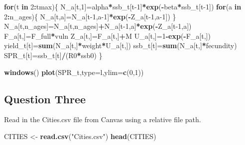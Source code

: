 \documentclass[
  12pt,
]{article}
\newenvironment{Shaded}{\begin{snugshade}}{\end{snugshade}}
\newcommand{\AttributeTok}[1]{\textcolor[rgb]{0.13,0.29,0.53}{#1}}
\newcommand{\ControlFlowTok}[1]{\textcolor[rgb]{0.13,0.29,0.53}{\textbf{#1}}}
\newcommand{\DecValTok}[1]{\textcolor[rgb]{0.00,0.00,0.81}{#1}}
\newcommand{\FunctionTok}[1]{\textcolor[rgb]{0.13,0.29,0.53}{\textbf{#1}}}
\newcommand{\NormalTok}[1]{#1}
\newcommand{\OtherTok}[1]{\textcolor[rgb]{0.56,0.35,0.01}{#1}}
\newcommand{\SpecialCharTok}[1]{\textcolor[rgb]{0.81,0.36,0.00}{\textbf{#1}}}
\newcommand{\StringTok}[1]{\textcolor[rgb]{0.31,0.60,0.02}{#1}}
\begin{document}
\begin{Shaded}
\begin{Highlighting}[]
\ControlFlowTok{for}\NormalTok{(t }\ControlFlowTok{in} \DecValTok{2}\SpecialCharTok{:}\NormalTok{tmax)\{}
\NormalTok{  N\_a[t,}\DecValTok{1}\NormalTok{]}\OtherTok{=}\NormalTok{alpha}\SpecialCharTok{*}\NormalTok{ssb\_t[t}\DecValTok{{-}1}\NormalTok{]}\SpecialCharTok{*}\FunctionTok{exp}\NormalTok{(}\SpecialCharTok{{-}}\NormalTok{beta}\SpecialCharTok{*}\NormalTok{ssb\_t[t}\DecValTok{{-}1}\NormalTok{])}
  \ControlFlowTok{for}\NormalTok{(a }\ControlFlowTok{in} \DecValTok{2}\SpecialCharTok{:}\NormalTok{n\_ages)\{}
\NormalTok{    N\_a[t,a]}\OtherTok{=}\NormalTok{N\_a[t}\DecValTok{{-}1}\NormalTok{,a}\DecValTok{{-}1}\NormalTok{]}\SpecialCharTok{*}\FunctionTok{exp}\NormalTok{(}\SpecialCharTok{{-}}\NormalTok{Z\_a[t}\DecValTok{{-}1}\NormalTok{,a}\DecValTok{{-}1}\NormalTok{])}
\NormalTok{  \}}
\NormalTok{  N\_a[t,n\_ages]}\OtherTok{=}\NormalTok{N\_a[t,n\_ages]}\SpecialCharTok{+}\NormalTok{N\_a[t}\DecValTok{{-}1}\NormalTok{,a]}\SpecialCharTok{*}\FunctionTok{exp}\NormalTok{(}\SpecialCharTok{{-}}\NormalTok{Z\_a[t}\DecValTok{{-}1}\NormalTok{,a])  }
\NormalTok{  F\_a[t,]}\OtherTok{=}\NormalTok{F\_full}\SpecialCharTok{*}\NormalTok{vuln}
\NormalTok{  Z\_a[t,]}\OtherTok{=}\NormalTok{F\_a[t,]}\SpecialCharTok{+}\NormalTok{M}
\NormalTok{  U\_a[t,]}\OtherTok{=}\DecValTok{1}\SpecialCharTok{{-}}\FunctionTok{exp}\NormalTok{(}\SpecialCharTok{{-}}\NormalTok{F\_a[t,])}
\NormalTok{  yield\_t[t]}\OtherTok{=}\FunctionTok{sum}\NormalTok{(N\_a[t,]}\SpecialCharTok{*}\NormalTok{weight}\SpecialCharTok{*}\NormalTok{U\_a[t,])}
\NormalTok{  ssb\_t[t]}\OtherTok{=}\FunctionTok{sum}\NormalTok{(N\_a[t,]}\SpecialCharTok{*}\NormalTok{fecundity)}
\NormalTok{  SPR\_t[t]}\OtherTok{=}\NormalTok{ssb\_t[t]}\SpecialCharTok{/}\NormalTok{(R0}\SpecialCharTok{*}\NormalTok{ssb0)}
\NormalTok{\}}
  
\FunctionTok{windows}\NormalTok{()}
\FunctionTok{plot}\NormalTok{(SPR\_t,}\AttributeTok{type=}\StringTok{\textquotesingle{}l\textquotesingle{}}\NormalTok{,}\AttributeTok{ylim=}\FunctionTok{c}\NormalTok{(}\DecValTok{0}\NormalTok{,}\DecValTok{1}\NormalTok{)) }
\end{Highlighting}
\end{Shaded}

\subsection{Question Three}\label{question-three}

Read in the Cities.csv file from Canvas using a relative file path.

\begin{Shaded}
\begin{Highlighting}[]
\NormalTok{CITIES }\OtherTok{\textless{}{-}} \FunctionTok{read.csv}\NormalTok{(}\StringTok{"Cities.csv"}\NormalTok{)}
\FunctionTok{head}\NormalTok{(CITIES)}
\end{Highlighting}
\end{Shaded}
\end{document}
